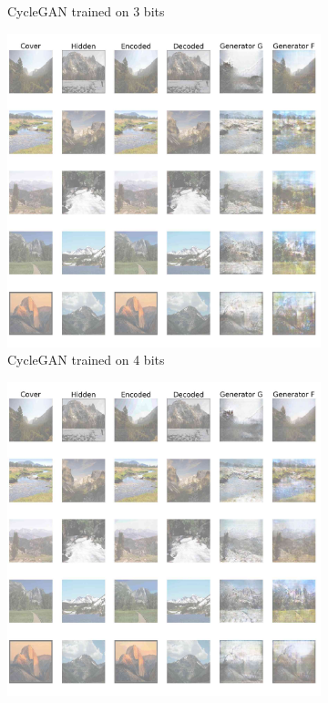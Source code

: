 \documentclass[conference]{IEEEtran}
\begin{document}
\begin{figure}[!hbt]
\begin{subfigure}[b]{0.28\textwidth}
            \caption{CycleGAN trained on 3 bits}
            \label{cycle_gan_new_3}
    \end{subfigure}
    \hspace{0.05\textwidth}
    \begin{subfigure}[b]{0.28\textwidth}
    \centering
            \includegraphics[scale=0.08]{images/cycle_sten_new_4.jpg}
            \caption{CycleGAN trained on 4 bits}
            \label{cycle_gan_new_4}
    \end{subfigure}
    \hspace{0.05\textwidth}
    \begin{subfigure}[b]{0.28\textwidth}
    \centering
            \includegraphics[scale=0.08]{images/cycle_sten_new_5.jpg}

\end{subfigure}
\end{figure}
\end{document}

